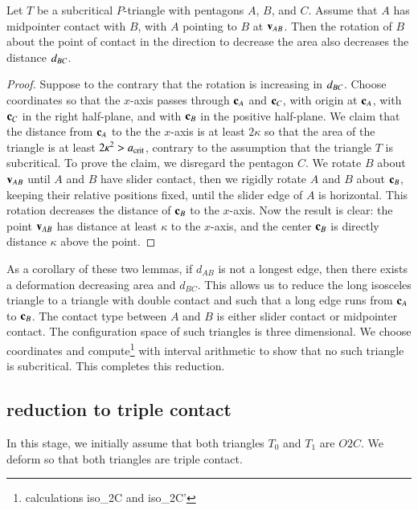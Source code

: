 \begin{lemma}  
  Let $T$ be a subcritical $P$-triangle with pentagons $A$, $B$, and
  $C$.  Assume that $A$ has midpointer contact with $B$, with $A$
  pointing to $B$ at ${\mathbf v}_{AB}$.  Then the rotation of $B$ about the
  point of contact in the direction to decrease the area also
  decreases the distance $d_{BC}$.
\end{lemma}

\begin{proof} 
  Suppose to the contrary that the rotation is increasing in
  $d_{BC}$.  Choose coordinates so that the $x$-axis passes through
  ${\mathbf c}_A$ and ${\mathbf c}_C$, with origin at ${\mathbf c}_A$, with ${\mathbf c}_C$ in the right
  half-plane, and with ${\mathbf c}_B$ in the positive half-plane.  We claim
  that the distance from ${\mathbf c}_A$ to the the $x$-axis is at least
  $2\kappa$ so that the area of the triangle is at least $2\kappa^2 >
  a_\text{crit}$, contrary to the assumption that the triangle $T$ is
  subcritical.  To prove the claim, we disregard the pentagon $C$.  We
  rotate $B$ about ${\mathbf v}_{AB}$ until $A$ and $B$ have slider contact,
  then we rigidly rotate $A$ and $B$ about ${\mathbf c}_B$, keeping their
  relative positions fixed, until the slider edge of $A$ is
  horizontal.  This rotation decreases the distance of ${\mathbf c}_B$ to the
  $x$-axis.  Now the result is clear: the point ${\mathbf v}_{AB}$ has distance
  at least $\kappa$ to the $x$-axis, and the center ${\mathbf c}_B$ is directly
  distance $\kappa$ above the point.
\end{proof}

As a corollary of these two lemmas, if $d_{AB}$ is not a longest edge, then
there exists a deformation decreasing area and $d_{BC}$.  This allows us to
 reduce the long isosceles triangle to a triangle with double
contact and such that a long edge runs from   ${\mathbf c}_A$ to ${\mathbf c}_B$.
The contact type between $A$ and $B$ is
either slider contact or midpointer contact.  The configuration space
of such triangles is three dimensional.  We choose coordinates and
compute\footnote{calculations iso\_2C and iso\_2C'} with interval
arithmetic to show that no such triangle is subcritical.  This
completes this reduction.

\subsection{reduction to triple contact}

In this stage, we initially assume that both triangles $T_0$ and $T_1$
are $O2C$.  We deform so that both triangles are triple contact.

